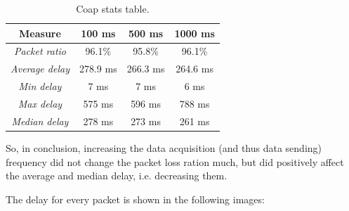 \documentclass[]{article}
\begin{document}
\begin{table}
\centering
\begin{tabular}{|c|c|c|c|}
	\hline
	\textbf{Measure} & \textbf{100 ms} & \textbf{500 ms} & \textbf{1000 ms} \\
	\hline
	\textit{Packet ratio} & 96.1\% & 95.8\%  & 96.1\% \\
	\hline
	\textit{Average delay} & 278.9 ms & 266.3 ms & 264.6 ms \\
	\hline
	\textit{Min delay} & 7 ms & 7 ms & 6 ms \\
	\hline
	\textit{Max delay} & 575 ms & 596 ms & 788 ms \\
	\hline
	\textit{Median delay} & 278 ms & 273 ms & 261 ms \\
	\hline
\end{tabular} 
\caption{\label{coap}Coap stats table.}
\end{table}

So, in conclusion, increasing the data acquisition (and  thus data sending) frequency did not change the packet loss ration much, but did positively affect the average and median delay, i.e. decreasing them. 

The delay for every packet is shown in the following images:
\end{document}
